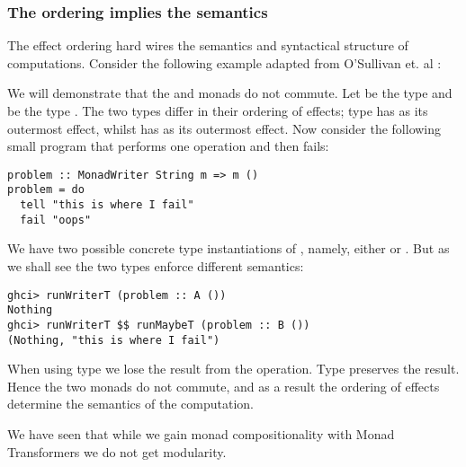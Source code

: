 \subsubsection{The ordering implies the semantics}
The effect ordering hard wires the semantics and syntactical structure of computations. Consider the following example adapted from O'Sullivan et. al \cite{O'Sullivan2008}:
\begin{example}
We will demonstrate that the  and  monads do not commute. Let  be the type 
 and  be the type . The two types differ in their ordering of effects; type  has  as its outermost effect, whilst  has  as its outermost effect. Now consider the following small program that performs one  operation and then fails:
\begin{lstlisting}[style=haskell]
problem :: MonadWriter String m => m ()
problem = do
  tell "this is where I fail"
  fail "oops"
\end{lstlisting}
We have two possible concrete type instantiations of , namely, either  or . But as we shall see the two types enforce different semantics:
\begin{lstlisting}[style=haskell]
ghci> runWriterT (problem :: A ())
Nothing
ghci> runWriterT $$ runMaybeT (problem :: B ())
(Nothing, "this is where I fail")
\end{lstlisting}
When using type  we lose the result from the  operation. Type  preserves the result.
Hence the two monads do not commute, and as a result the ordering of effects determine the semantics of the computation.
\end{example}
We have seen that while we gain monad compositionality with Monad Transformers we do not get modularity.